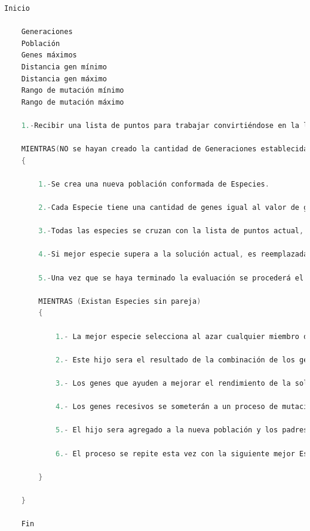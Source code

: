 \begin{lstlisting}[language=C++, caption=Algoritmo genético aplicado en las pruebas, label=lst:AlgoritmoGeneticoPruebas]
    Inicio
        
    Generaciones
    Población
    Genes máximos
    Distancia gen mínimo
    Distancia gen máximo
    Rango de mutación mínimo
    Rango de mutación máximo
    
    1.-Recibir una lista de puntos para trabajar convirtiéndose en la lista de puntos actual.
    
    MIENTRAS(NO se hayan creado la cantidad de Generaciones establecidas)
    {
    
    	1.-Se crea una nueva población conformada de Especies.
    	
    	2.-Cada Especie tiene una cantidad de genes igual al valor de genes máximos y sus valores oscilan entre los números máximos y mínimos de distancia.
    	
    	3.-Todas las especies se cruzan con la lista de puntos actual, se ordenan de acuerdo a su desempeño.
    	
    	4.-Si mejor especie supera a la solución actual, es reemplazada, de lo contrario la solución actual permanecerá dentro de la población sustituyendo a la solución más débil.
    	
    	5.-Una vez que se haya terminado la evaluación se procederá el siguiente paso.
    	
    	MIENTRAS (Existan Especies sin pareja)
    	{
    	
    		1.- La mejor especie selecciona al azar cualquier miembro de la población convirtiéndose en padre y madre de la siguiente especie.
    		
    		2.- Este hijo sera el resultado de la combinación de los genes en posiciones pares del padre y los genes de las posiciones impares de la madre.
    		
    		3.- Los genes que ayuden a mejorar el rendimiento de la solución se llamaran dominantes mientras que los que afecten se llamaran recesivos.
    		
    		4.- Los genes recesivos se someterán a un proceso de mutación, donde sus valores serán alterados de acuerdo a las distancias mínimas y máximas, la cantidad de genes mutados será determinado por los rangos mínimos y máximos de mutación.
    		
    		5.- El hijo sera agregado a la nueva población y los padres serán descartados.
    		
    		6.- El proceso se repite esta vez con la siguiente mejor Especie.
    		
    	}
    	
    }
               
    Fin
\end{lstlisting}

